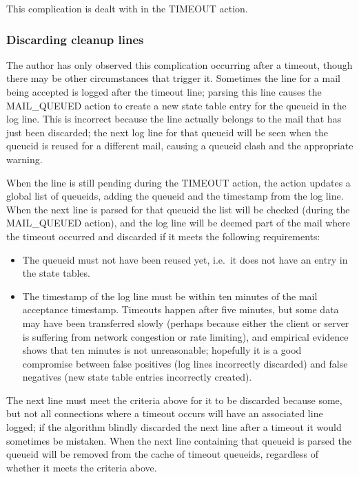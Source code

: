 This complication is dealt with in the TIMEOUT action.

\subsubsection{Discarding cleanup lines}

\label{discarding cleanup lines}

The author has only observed this complication occurring after a timeout,
though there may be other circumstances that trigger it.  Sometimes the
 line for a mail being accepted is logged after the timeout
line; parsing this line causes the MAIL\_QUEUED action to create a new
state table entry for the queueid in the log line.  This is incorrect
because the line actually belongs to the mail that has just been discarded;
the next log line for that queueid will be seen when the queueid is reused
for a different mail, causing a queueid clash and the appropriate warning.

When the  line is still pending during the TIMEOUT action,
the action updates a global list of queueids, adding the queueid and the
timestamp from the log line.  When the next  line is parsed
for that queueid the list will be checked (during the MAIL\_QUEUED action),
and the log line will be deemed part of the mail where the timeout occurred
and discarded if it meets the following requirements:

\begin{itemize}

    \item The queueid must not have been reused yet, i.e.\ it does not have
        an entry in the state tables.

    \item The timestamp of the  log line must be within ten
        minutes of the mail acceptance timestamp.  Timeouts happen after
        five minutes, but some data may have been transferred slowly
        (perhaps because either the client or server is suffering from
        network congestion or rate limiting), and empirical evidence shows
        that ten minutes is not unreasonable; hopefully it is a good
        compromise between false positives (log lines incorrectly
        discarded) and false negatives (new state table entries incorrectly
        created).

\end{itemize}

The next  line must meet the criteria above for it to be
discarded because some, but not all connections where a timeout occurs will
have an associated  line logged; if the algorithm blindly
discarded the next  line after a timeout it would sometimes
be mistaken.  When the next  line containing that queueid is
parsed the queueid will be removed from the cache of timeout queueids,
regardless of whether it meets the criteria above.

